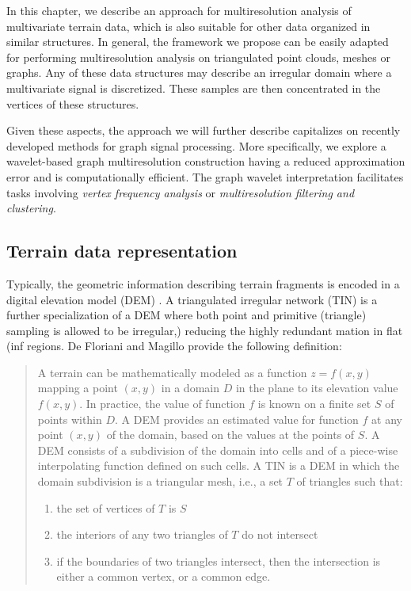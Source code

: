 \documentclass[graybox]{svmult}
\begin{document}
	In this chapter, we describe an approach for multiresolution analysis of multivariate terrain data, which is also suitable for other data organized in similar structures. In general, the framework we propose can be easily adapted for performing multiresolution analysis on triangulated point clouds, meshes or graphs. Any of these data structures may describe an irregular domain where a multivariate signal is discretized. These samples are then concentrated in the vertices of these structures.
	
	Given these aspects, the approach we will further describe capitalizes on recently developed methods for graph signal processing. More specifically, we explore a wavelet-based graph multiresolution construction having a reduced approximation error and is computationally efficient. The graph wavelet interpretation facilitates tasks involving \emph{vertex frequency analysis} or \emph{multiresolution filtering and clustering}.
	
	
	\subsection{Terrain data representation}
	Typically, the geometric information describing terrain fragments is encoded in a
	digital elevation model (DEM) \cite{vanKreveld1997}. A triangulated irregular network (TIN) is a further
	specialization of a DEM where both point and primitive (triangle) sampling is allowed to be irregular,) reducing the highly redundant mation in flat (inf regions.
	De Floriani and Magillo \cite{Floriani2016} provide the following definition:
	
	\begin{quotation}
		A terrain can be mathematically modeled as a function $z = f (x, y)$ mapping a point $(x, y)$ in a domain $D$ in the plane to its elevation value $f (x, y)$.
		In practice, the value of function $f$ is known on a finite set $S$ of points within $D$. 
		A DEM provides an estimated value for function $f$ at any point $(x, y)$ of the domain, based on the values at the points of $S$. 
		A DEM consists of a subdivision of the domain into cells and of a piece-wise interpolating function defined on such cells.
		A TIN is a DEM in which the domain subdivision is a triangular mesh, i.e., a set $T$ of triangles such that: 
		\begin{enumerate}
			\item the set of vertices of $T$ is $S$
			\item the interiors of any two triangles of $T$ do not intersect
			\item if the boundaries of two triangles intersect, then the intersection is either a common vertex, or a common edge.
		\end{enumerate}
	\end{quotation}
	
\end{document}
